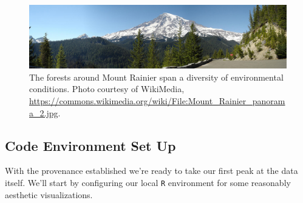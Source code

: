 \documentclass[
  letterpaper,
  DIV=11,
  numbers=noendperiod]{scrartcl}
\begin{document}
\begin{figure}

{\centering \includegraphics[width=1\textwidth,height=\textheight]{figures/photos/mount_rainier_panorama.jpg}

}

\caption{\label{fig-mount-rainier}The forests around Mount Rainier span
a diversity of environmental conditions. Photo courtesy of WikiMedia,
\url{https://commons.wikimedia.org/wiki/File:Mount_Rainier_panorama_2.jpg}.}

\end{figure}

\hypertarget{sec:initial-setup}{%
\subsection{Code Environment Set Up}\label{sec:initial-setup}}

With the provenance established we're ready to take our first peak at
the data itself. We'll start by configuring our local \texttt{R}
environment for some reasonably aesthetic visualizations.
\end{document}
